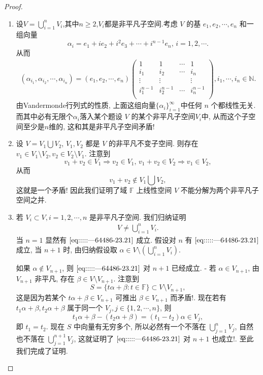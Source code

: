 \documentclass[../../main.tex]{subfiles}%
\begin{document}
\begin{proof}
\begin{enumerate}
\item 设$V=\bigcup_{i=1}^n{V_i}$,其中$n\geqslant 2$,$V_i$都是非平凡子空间.考虑 \( V \) 的基 \( e_1, e_2, \cdots, e_n \) 和一组向量  
\[
\alpha_i = e_1 + i e_2 + i^2 e_3 + \cdots + i^{n-1} e_n, \, i = 1, 2, \cdots.
\] 
从而
\begin{align*}
\left( \alpha _{i_1},\alpha _{i_2},\cdots ,\alpha _{i_n} \right) =\left( e_1,e_2,\cdots ,e_n \right) \left( \begin{matrix}
1&		1&		\cdots&		1\\
i_1&		i_2&		\cdots&		i_n\\
\vdots&		\vdots&		&		\vdots\\
i_{1}^{n-1}&		i_{2}^{n-1}&		\cdots&		i_{n}^{n-1}\\
\end{matrix} \right) ,i_1,\cdots ,i_n\in \mathbb{N} .
\end{align*}
由Vandermonde行列式的性质, 上面这组向量$\{\alpha_i\}_{i=1}^{\infty}$中任何 \( n \) 个都线性无关. 而其中必有无限个$\alpha_i$落入某个题设 \( V \) 的某个非平凡子空间$V_i$中, 从而这个子空间至少是\( n \)维的, 这和其是非平凡子空间矛盾!  

\item 设 \( V = V_1 \bigcup V_2 \), \( V_1, V_2 \) 都是 \( V \) 的非平凡不变子空间. 则存在 \( v_1 \in V_1 \setminus V_2, v_2 \in V_2 \setminus V_1 \). 注意到
\[
v_1 + v_2 \in V_1 \Rightarrow v_2 \in V_1, \, v_1 + v_2 \in V_2 \Rightarrow v_1 \in V_2,
\]  
从而  
\[
v_1 + v_2 \notin V_1 \bigcup V_2,
\]  
这就是一个矛盾! 因此我们证明了域 \( \mathbb{F} \) 上线性空间 \( V \) 不能分解为两个非平凡子空间之并.  

\item 若 \( V_i \subset V, i = 1, 2, \cdots, n \) 是非平凡子空间. 我们归纳证明  
\begin{align}
V \neq \bigcup_{i=1}^n V_i. \label{eq:::::---64486-23.21}
\end{align}
当 \( n = 1 \) 显然有 \(\eqref{eq:::::---64486-23.21}\) 成立. 假设对 \( n \) 有 \(\eqref{eq:::::---64486-23.21}\) 成立, 当 \( n + 1 \) 时, 由归纳假设取 \( \alpha \in V \setminus \left( \bigcup_{i=1}^n V_i \right) \).  

如果 \( \alpha \notin V_{n+1} \), 则 \(\eqref{eq:::::---64486-23.21}\) 对 \( n + 1 \) 已经成立.  
- 若 \( \alpha \in V_{n+1} \), 由 \( V_{n+1} \) 非平凡, 存在 \( \beta \in V \setminus V_{n+1} \). 注意到  
\[
S = \{ t\alpha + \beta : t \in \mathbb{F} \} \subset V \setminus V_{n+1},
\]  
这是因为若某个 \( t\alpha + \beta \in V_{n+1} \) 可推出 \( \beta \in V_{n+1} \) 而矛盾!. 现在若有 \( t_1\alpha + \beta, t_2\alpha + \beta \) 属于同一个 \( V_j, j \in \{1, 2, \cdots, n\} \), 则  
\[
t_1\alpha + \beta - (t_2\alpha + \beta) = (t_1 - t_2) \alpha \in V_j,
\]  
即 \( t_1 = t_2 \). 现在 \( S \) 中向量有无穷多个, 所以必然有一个不落在 \( \bigcup_{j=1}^n V_j \), 自然也不落在 \( \bigcup_{j=1}^{n+1} V_j \), 这就证明了 \(\eqref{eq:::::---64486-23.21}\) 对 \( n + 1 \) 也成立!.  
至此我们完成了证明.
\end{enumerate}

\end{proof}
\end{document}
